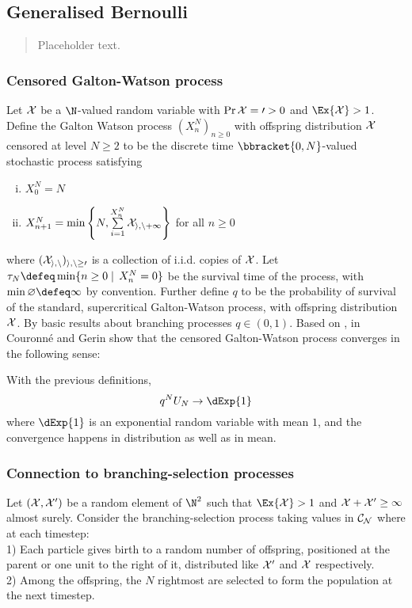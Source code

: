 \subsection{Generalised Bernoulli}

\begin{quote}
{\small Placeholder text. }
\end{quote}

\subsubsection{Censored Galton-Watson process}
Let $\cal{X}$ be a $\N$-valued random variable with $\Pr{\cal{X} = 0} > 0$ and $\Ex{\cal{X}} > 1$. Define the Galton Watson process $(X^N_n)_{n \geq 0}$ with offspring distribution $\cal{X}$ censored at level $N \geq 2$ to be the discrete time $\bbracket{0,N}$-valued stochastic process satisfying
\begin{enumerate}[(i)]
\item $X^N_0 = N$
\item $X^N_{n + 1} = \min\left\{ N, \sum\limits_{i = 1}^{X^N_n} \cal{X}_{i, n + 1}\right\}$ for all $n \geq 0$
\end{enumerate}
where $(\cal{X}_{i, n})_{i,n \geq 0}$ is a collection of i.i.d. copies of $\cal{X}$. Let $\tau_N \defeq \min\{ n \geq 0 \mid\, X^N_n = 0\}$ be the survival time of the process, with $\min\varnothing \defeq \infty$ by convention. Further define $q$ to be the probability of survival of the standard, supercritical Galton-Watson process, with offspring distribution $\cal{X}$. By basic results about branching processes $q \in (0,1)$. Based on \cite{topchii2009time}, in \cite{couronne2014branching} Couronné and Gerin show that the censored Galton-Watson process converges in the following sense:
\begin{theorem}
With the previous definitions, 
\begin{equation}
q^N U_N \rightarrow \dExp{1}
\end{equation}
where $\dExp{1}$ is an exponential random variable with mean $1$, and the convergence happens in distribution as well as in mean. 
\end{theorem}

\subsubsection{Connection to branching-selection processes}
Let $(\cal{X}, \cal{X}')$ be a random element of $\N^2$ such that $\Ex{\cal{X}} > 1$ and $\cal{X} + \cal{X}' \geq 1$ almost surely. Consider the branching-selection process taking values in $\cal{C}_N$ where at each timestep: \\

1) Each particle gives birth to a random number of offspring, positioned at the parent or one unit to the right of it, distributed like $\cal{X}'$ and $\cal{X}$ respectively. \\

2) Among the offspring, the $N$ rightmost are selected to form the population at the next timestep. \\


